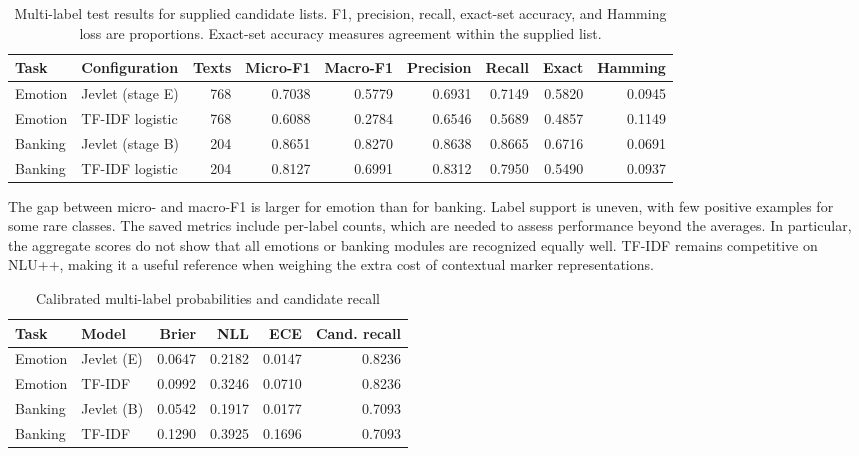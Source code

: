 \documentclass[conference]{IEEEtran}
\begin{document}
\begin{table}[!t]
\caption{Multi-label test results for supplied candidate lists. F1, precision, recall, exact-set accuracy, and Hamming loss are proportions. Exact-set accuracy measures agreement within the supplied list.}
\label{tab:multilabel}
\centering\footnotesize\setlength{\tabcolsep}{4.5pt}
\begin{tabular}{llrrrrrrr}\toprule
Task & Configuration & Texts & Micro-F1 & Macro-F1 & Precision & Recall & Exact & Hamming\\\midrule
Emotion & Jevlet (stage E) & 768 & 0.7038 & 0.5779 & 0.6931 & 0.7149 & 0.5820 & 0.0945\\
Emotion & TF-IDF logistic & 768 & 0.6088 & 0.2784 & 0.6546 & 0.5689 & 0.4857 & 0.1149\\
Banking & Jevlet (stage B) & 204 & 0.8651 & 0.8270 & 0.8638 & 0.8665 & 0.6716 & 0.0691\\
Banking & TF-IDF logistic & 204 & 0.8127 & 0.6991 & 0.8312 & 0.7950 & 0.5490 & 0.0937\\
\bottomrule\end{tabular}
\end{table}

The gap between micro- and macro-F1 is larger for emotion than for banking. Label support is uneven, with few positive examples for some rare classes. The saved metrics include per-label counts, which are needed to assess performance beyond the averages. In particular, the aggregate scores do not show that all emotions or banking modules are recognized equally well. TF-IDF remains competitive on NLU++, making it a useful reference when weighing the extra cost of contextual marker representations.

\begin{table}[!t]
\caption{Calibrated multi-label probabilities and candidate recall}
\label{tab:probability}
\centering\scriptsize\setlength{\tabcolsep}{3pt}
\begin{tabular}{llrrrr}\toprule
Task & Model & Brier & NLL & ECE & Cand. recall\\\midrule
Emotion & Jevlet (E) & 0.0647 & 0.2182 & 0.0147 & 0.8236\\
Emotion & TF-IDF & 0.0992 & 0.3246 & 0.0710 & 0.8236\\
Banking & Jevlet (B) & 0.0542 & 0.1917 & 0.0177 & 0.7093\\
Banking & TF-IDF & 0.1290 & 0.3925 & 0.1696 & 0.7093\\
\bottomrule\end{tabular}
\end{table}
\end{document}
